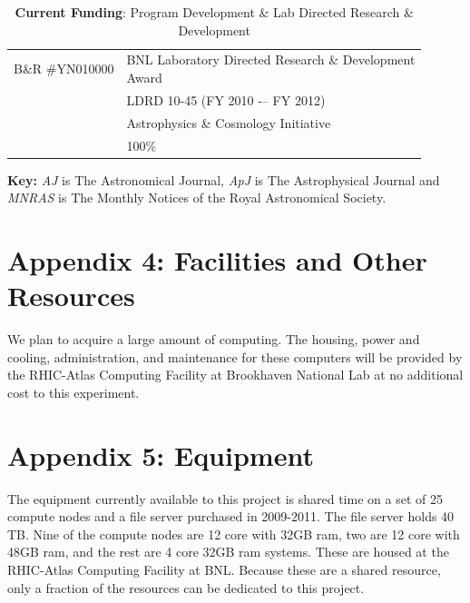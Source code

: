 \documentclass[12pt]{article}
\begin{document}
\begin{table}[h]
\begin{center}
\begin{tabular*}{0.85\textwidth}{ll}
B\&R \#YN010000  & \parbox[t]{\textwidth}{BNL Laboratory Directed 
   Research \& Development \\ Award} \\
                 & LDRD 10-45 (FY 2010 -– FY 2012) \\
                 & Astrophysics \& Cosmology Initiative \\
                 & 100\%
\end{tabular*}
\parbox{0.85\textwidth}{\caption{{\bf Current Funding}: Program Development 
\& Lab Directed Research \& Development \label{table:support}}}
\end{center}
\end{table}



\newpage
{}
\renewcommand{\refname}{\section*{Appendix 3: Bibliography for Narrative}\label{app:bib}}


\vspace{5mm}
\noindent
{\bf Key:} {\it AJ} is The Astronomical Journal, {\it ApJ} is The 
Astrophysical Journal and {\it MNRAS} is The Monthly Notices of the Royal
Astronomical Society.






\newpage
{}
\section*{Appendix 4: Facilities and Other Resources}

We plan to acquire a large amount of computing.  The housing, power and
cooling, administration, and maintenance for these computers will be provided
by the RHIC-Atlas Computing Facility at Brookhaven National Lab at no additional cost
to this experiment.		

\newpage
{}
\section*{Appendix 5: Equipment}

The equipment currently available to this project is shared time on a set of 25
compute nodes and a file server purchased in 2009-2011.  The file server holds
40 TB. Nine of the compute nodes are 12 core with 32GB ram, two are 12 core
with 48GB ram, and the rest are 4 core 32GB ram systems.  These are housed at
the RHIC-Atlas Computing Facility at BNL.  Because these are a shared resource,
only a fraction of the resources can be dedicated to this project.
\end{document}
